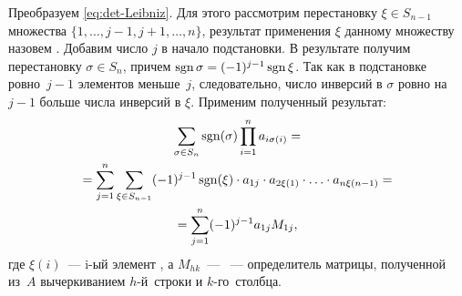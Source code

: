     Преобразуем \eqref{eq:det-Leibniz}. Для этого рассмотрим перестановку $\xi \in S_{n-1}$ множества $\{1, \ldots, j - 1, j + 1, \ldots, n \}$, результат применения $\xi$ данному множеству назовем . Добавим число $j$ в начало подстановки. В результате получим перестановку $\sigma \in S_n$, причем $\operatorname{sgn} \sigma = (-1)^{j-1} \operatorname{sgn} \xi$. Так как в подстановке ровно~$j - 1$ элементов меньше~$j$, следовательно, число инверсий в $\sigma$ ровно на~$j-1$ больше числа инверсий в $\xi$. Применим полученный результат: 
    \begin{multline}
        \sum\limits_{\sigma \in S_n} \operatorname{sgn}(\sigma) \prod\limits_{i = 1}^n a_{i\sigma(i)} = \\
            = \sum\limits_{j=1}^n \sum\limits_{\xi \in S_{n-1}} (-1)^{j-1}\operatorname{sgn}(\xi) \cdot a_{1j} \cdot a_{2\xi(1)} \cdot \ldots  \cdot a_{n\xi(n-1)} = \\
            = \sum\limits_{j=1}^n (-1)^{j-1} a_{1j} M_{1j},
            \label{eq:det-minor}
    \end{multline}
    где $\xi(i)$~--- i-ый элемент , а $M_{hk}$~--- ~--- определитель матрицы, полученной из~$A$ вычеркиванием $h$-й~строки и $k$-го~столбца.
    
    
